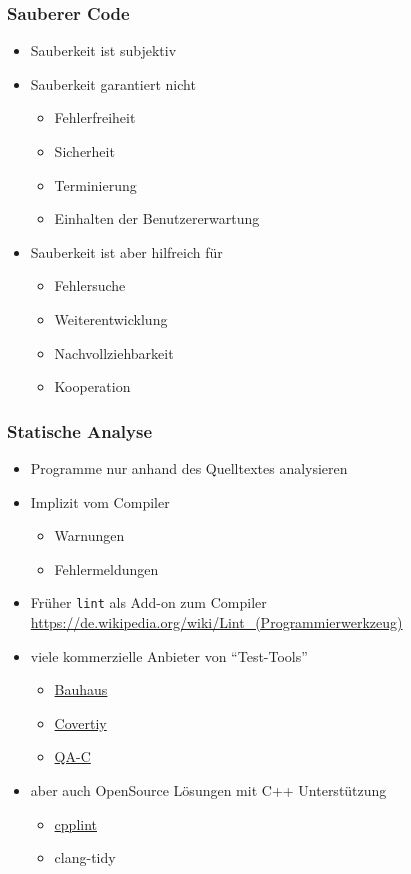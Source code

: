 \documentclass[aspectratio=169]{beamer}
\begin{document}
\begin{frame}
  \frametitle{Sauberer Code}
  \begin{itemize}
  \item Sauberkeit ist subjektiv
    \pause
  \item Sauberkeit garantiert nicht
    \begin{itemize}
    \item Fehlerfreiheit \pause
    \item Sicherheit \pause
    \item Terminierung \pause
    \item Einhalten der Benutzererwartung \pause
    \end{itemize}
    \pause
  \item Sauberkeit ist aber hilfreich für
    \begin{itemize}
      \pause
    \item Fehlersuche \pause
    \item Weiterentwicklung \pause
    \item Nachvollziehbarkeit \pause
    \item Kooperation
    \end{itemize}
  \end{itemize}
\end{frame}

\begin{frame}
  \frametitle{Statische Analyse}
  \begin{itemize}
  \item Programme nur anhand des Quelltextes analysieren
    \pause
  \item Implizit vom Compiler \pause
    \begin{itemize}
    \item Warnungen \pause 
    \item Fehlermeldungen \pause
    \end{itemize}
  \item Früher \texttt{lint} als Add-on zum Compiler\\
    \qquad \url{https://de.wikipedia.org/wiki/Lint_(Programmierwerkzeug)}
    \pause
  \item viele kommerzielle Anbieter von ``Test-Tools''
    \begin{itemize}
    \item \href{https://en.wikipedia.org/wiki/Bauhaus_Project_(computing)}{Bauhaus}
    \pause
    \item \href{https://en.wikipedia.org/wiki/Coverity}{Covertiy}
      \pause
    \item \href{https://en.wikipedia.org/wiki/QA-C}{QA-C}
    \end{itemize}
  \item aber auch OpenSource Lösungen mit C++ Unterstützung
    \pause
    \begin{itemize}
    \item \href{https://en.wikipedia.org/wiki/Cpplint}{cpplint}
      \pause
    \item clang-tidy
      \pause
    \end{itemize}
  \end{itemize}
\end{frame}
\end{document}
